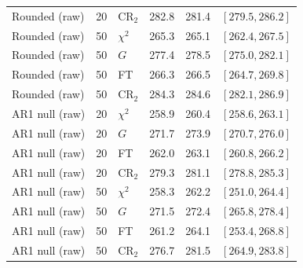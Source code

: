 \begin{table}[t]
\begin{tabular}{lllrrr}
Rounded (raw) & 20 & CR$_2$ & 282.8 & 281.4 & $[279.5, 286.2]$ \\
Rounded (raw) & 50 & $\chi^2$ & 265.3 & 265.1 & $[262.4, 267.5]$ \\
Rounded (raw) & 50 & $G$ & 277.4 & 278.5 & $[275.0, 282.1]$ \\
Rounded (raw) & 50 & FT & 266.3 & 266.5 & $[264.7, 269.8]$ \\
Rounded (raw) & 50 & CR$_2$ & 284.3 & 284.6 & $[282.1, 286.9]$ \\
AR1 null (raw) & 20 & $\chi^2$ & 258.9 & 260.4 & $[258.6, 263.1]$ \\
AR1 null (raw) & 20 & $G$ & 271.7 & 273.9 & $[270.7, 276.0]$ \\
AR1 null (raw) & 20 & FT & 262.0 & 263.1 & $[260.8, 266.2]$ \\
AR1 null (raw) & 20 & CR$_2$ & 279.3 & 281.1 & $[278.8, 285.3]$ \\
AR1 null (raw) & 50 & $\chi^2$ & 258.3 & 262.2 & $[251.0, 264.4]$ \\
AR1 null (raw) & 50 & $G$ & 271.5 & 272.4 & $[265.8, 278.4]$ \\
AR1 null (raw) & 50 & FT & 261.2 & 264.1 & $[253.4, 268.8]$ \\
AR1 null (raw) & 50 & CR$_2$ & 276.7 & 281.5 & $[264.9, 283.8]$ \\
\bottomrule
\end{tabular}
\end{table}

